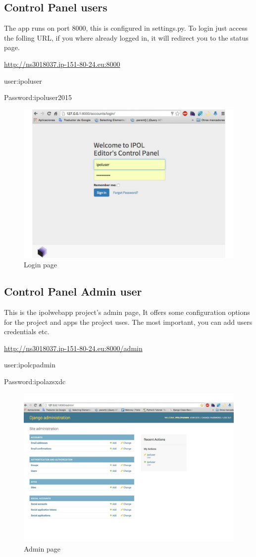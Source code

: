 \subsection{Control Panel users}
The app runs on port 8000, this is configured in settings.py.
To login just access the folling URL, if you where already logged in, it will redirect you to the status page.

\url{http://ns3018037.ip-151-80-24.eu:8000}

user:ipoluser

Password:ipoluser2015

\begin{figure}[!ht]
\centering
\includegraphics[width=0.5\columnwidth]{control_panel/images/login.pdf}
\caption{Login page} 
\label{fi:login_page}
\end{figure}

\subsection{Control Panel Admin user}
This is the ipolwebapp project's admin page, 
It offers some configuration options for the project and apps the project uses. The most important, you can add users credentials etc.

\url{http://ns3018037.ip-151-80-24.eu:8000/admin}

user:ipolcpadmin

Password:ipolazsxdc

\begin{figure}[!ht]
\centering
\includegraphics[width=0.5\columnwidth]{control_panel/images/admin.pdf}
\caption{Admin page} 
\label{fi:admin_page}
\end{figure}


